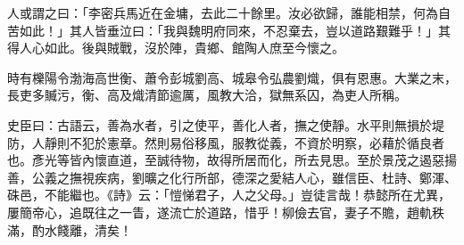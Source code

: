 \begin{pinyinscope}
 人或謂之曰：「李密兵馬近在金墉，去此二十餘里。汝必欲歸，誰能相禁，何為自苦如此！」其人皆垂泣曰：「我與魏明府同來，不忍棄去，豈以道路艱難乎！」其得人心如此。後與賊戰，沒於陣，貴鄉、館陶人庶至今懷之。



 時有櫟陽令渤海高世衡、蕭令彭城劉高、城皋令弘農劉熾，俱有恩惠。大業之末，長吏多贓污，衡、高及熾清節逾厲，風教大洽，獄無系囚，為吏人所稱。



 史臣曰：古語云，善為水者，引之使平，善化人者，撫之使靜。水平則無損於堤防，人靜則不犯於憲章。然則易俗移風，服教從義，不資於明察，必藉於循良者也。彥光等皆內懷直道，至誠待物，故得所居而化，所去見思。至於景茂之遏惡揚善，公義之撫視疾病，劉曠之化行所部，德深之愛結人心，雖信臣、杜詩、鄭渾、硃邑，不能繼也。《詩》云：「愷悌君子，人之父母。」豈徒言哉！恭懿所在尤異，屢簡帝心，追既往之一眚，遂流亡於道路，惜乎！柳儉去官，妻子不贍，趙軌秩滿，酌水餞離，清矣！



\end{pinyinscope}